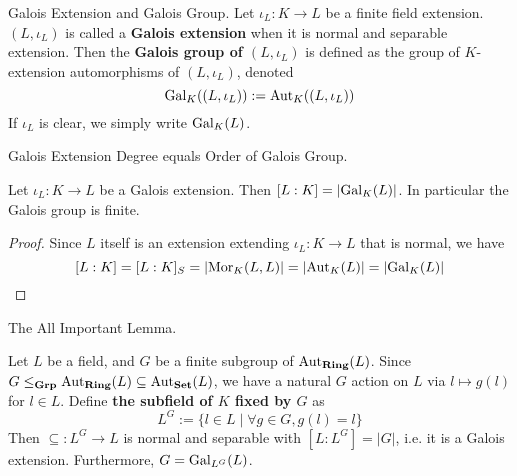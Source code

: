 \documentclass[../book.tex]{subfiles}
\begin{document}
\begin{dfn} Galois Extension and Galois Group.
    Let $\iota_L : K \to L$ be a finite field extension. 
    $(L,\iota_L)$ is called a \textbf{Galois extension} when 
    it is normal and separable extension.
    Then the \textbf{Galois group of $(L,\iota_L)$} is defined as 
    the group of $K$-extension automorphisms of $(L,\iota_L)$, denoted
    \[ \text{Gal}_{K}((L,\iota_L)) := \text{Aut}_{K}((L,\iota_L)) \]
    If $\iota_L$ is clear, we simply write $\text{Gal}_{K}(L)$. 
\end{dfn}
\begin{thm} Galois Extension Degree equals Order of Galois Group.
    
    Let $\iota_L : K \to L$ be a Galois extension. 
    Then $[L : K] = |\text{Gal}_{K}(L)|$. In particular the Galois group is finite. 
\end{thm}
\begin{proof}
    Since $L$ itself is an extension extending $\iota_L : K \to L$ that is normal,
    we have \[
        [L : K] = [L : K]_S = |\text{Mor}_{K}(L, L)| = |\text{Aut}_{K}(L)| = |\text{Gal}_{K}(L)|
    \]
\end{proof}
\begin{lem} The All Important Lemma.
    
    Let $L$ be a field, and $G$ be a finite subgroup of $\text{Aut}_{\mathbf{Ring}}(L)$. 
    Since $G \leq_{\mathbf{Grp}} \text{Aut}_{\mathbf{Ring}}(L) \subseteq \text{Aut}_{\mathbf{Set}}(L)$, 
    we have a natural $G$ action on $L$ via $l \mapsto g(l)$ for $l \in L$. 
    Define \textbf{the subfield of $K$ fixed by $G$} as
    \[ L^G := \{l \in L \mid \forall g \in G, g(l)=l\} \]
    Then $\subseteq : L^G \to L$ is normal and separable with $[L:L^G] = |G|$,
    i.e. it is a Galois extension. 
    Furthermore, $G = \text{Gal}_{L^G}(L)$.
\end{lem}
\end{document}
